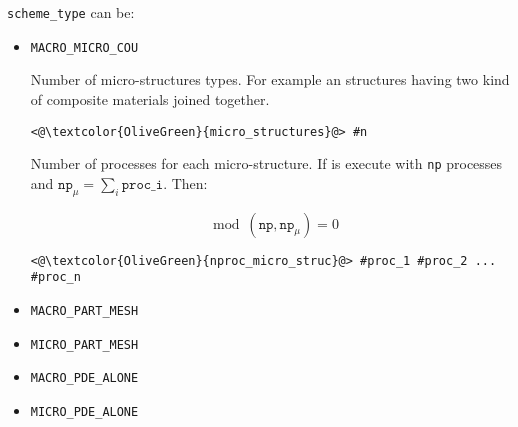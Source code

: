 \texttt{scheme\_type} can be:

\begin{itemize}
\item \texttt{MACRO_MICRO_COU}

Number of micro-structures types. For example an structures having two kind of composite materials
joined together.

\begin{lstlisting}[frame=single]
     <@\textcolor{OliveGreen}{micro_structures}@> #n
\end{lstlisting}

Number of processes for each micro-structure. If \micro is execute with \texttt{np} processes and $\texttt{np}_{\mu} =
\sum_{i} \texttt{proc_{i}}$. Then:

$$\mod{(\texttt{np} ,\texttt{np}_{\mu})} = 0$$

\begin{lstlisting}[frame=single]
     <@\textcolor{OliveGreen}{nproc_micro_struc}@> #proc_1 #proc_2 ... #proc_n
\end{lstlisting}

\item \texttt{MACRO_PART_MESH}   
\item \texttt{MICRO_PART_MESH}    
\item \texttt{MACRO_PDE_ALONE}    
\item \texttt{MICRO_PDE_ALONE}    
\end{itemize}





